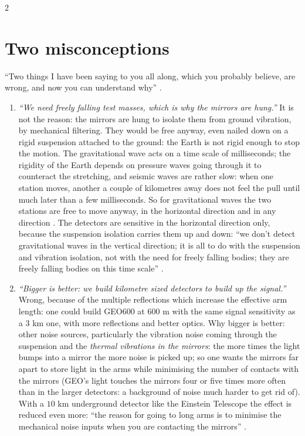 \begin{paracol}{2}
\section{Two misconceptions}\label{sec:c28-myths}

``Two things I have been saying to you all along, which you probably believe, are wrong, and now you can understand why'' .

\begin{enumerate}
  \item \emph{``We need freely falling test masses, which is why the mirrors are hung.''} It is not the reason: the mirrors are hung to isolate them from ground vibration, by mechanical filtering. They would be free anyway, even nailed down on a rigid suspension attached to the ground: the Earth is not rigid enough to stop the motion. The gravitational wave acts on a time scale of milliseconds; the rigidity of the Earth depends on pressure waves going through it to counteract the stretching, and seismic waves are rather slow: when one station moves, another a couple of kilometres away does not feel the pull until much later than a few milliseconds. So for gravitational waves the two stations are free to move anyway, in the horizontal direction and in any direction . The detectors are sensitive in the horizontal direction only, because the suspension isolation carries them up and down: ``we don't detect gravitational waves in the vertical direction; it is all to do with the suspension and vibration isolation, not with the need for freely falling bodies; they are freely falling bodies on this time scale'' .
  \item \emph{``Bigger is better: we build kilometre sized detectors to build up the signal.''} Wrong, because of the multiple reflections which increase the effective arm length: one could build GEO600 at $600$ m with the same signal sensitivity as a $3$ km one, with more reflections and better optics. Why bigger is better: other noise sources, particularly the vibration noise coming through the suspension and the \emph{thermal vibrations in the mirrors}: the more times the light bumps into a mirror the more noise is picked up; so one wants the mirrors far apart to store light in the arms while minimising the number of contacts with the mirrors (GEO's light touches the mirrors four or five times more often than in the larger detectors: a background of noise much harder to get rid of). With a $10$ km underground detector like the Einstein Telescope the effect is reduced even more: ``the reason for going to long arms is to minimise the mechanical noise inputs when you are contacting the mirrors'' .
\end{enumerate}


\end{paracol}
